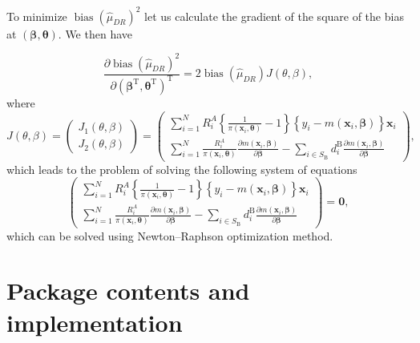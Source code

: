\documentclass[
]{jss}
\begin{document}
To minimize \(\operatorname{bias}\left(\hat{\mu}_{D R}\right)^2\) let us
calculate the gradient of the square of the bias at
\(\left(\boldsymbol{\beta}, \boldsymbol{\theta}\right)\). We then have

\begin{equation*}
\frac{\partial \operatorname{bias}\left(\hat{\mu}_{D R}\right)^2}{\partial\left(\boldsymbol{\beta}^{\mathrm{T}}, \boldsymbol{\theta}^{\mathrm{T}}\right)^{\mathrm{T}}}=2 \operatorname{bias}\left(\hat{\mu}_{D R}\right) J(\theta, \beta),
\end{equation*} where \begin{equation*}
J(\theta, \beta)=\left(\begin{array}{l}
J_1(\theta, \beta) \\
J_2(\theta, \beta)
\end{array}\right)=\left(\begin{array}{c}
\sum_{i=1}^N R_i^A\left\{\frac{1}{\pi\left(\boldsymbol{x}_i, \boldsymbol{\theta}\right)}-1\right\}\left\{y_i-m\left(\boldsymbol{x}_i, \boldsymbol{\beta}\right)\right\} \boldsymbol{x}_i \\
\sum_{i=1}^N \frac{R_i^A}{\pi\left(\boldsymbol{x}_i, \boldsymbol{\theta}\right)} \frac{\partial m\left(\boldsymbol{x}_i, \boldsymbol{\beta}\right)}{\partial \boldsymbol{\beta}}-\sum_{i \in S_{\mathrm{B}}} d_i^{\mathrm{B}} \frac{\partial m\left(\boldsymbol{x}_i, \boldsymbol{\beta}\right)}{\partial \boldsymbol{\beta}}
\end{array}\right),
\end{equation*} which leads to the problem of solving the following
system of equations \begin{equation}
\label{bias-min}
    \left(\begin{array}{c}
\sum_{i=1}^N R_i^A\left\{\frac{1}{\pi\left(\boldsymbol{x}_i, \boldsymbol{\theta}\right)}-1\right\}\left\{y_i-m\left(\boldsymbol{x}_i, \boldsymbol{\beta}\right)\right\} \boldsymbol{x}_i \\
\sum_{i=1}^N \frac{R_i^A}{\pi\left(\boldsymbol{x}_i, \boldsymbol{\theta}\right)} \frac{\partial m\left(\boldsymbol{x}_i, \boldsymbol{\beta}\right)}{\partial \boldsymbol{\beta}}-\sum_{i \in S_{\mathrm{B}}} d_i^{\mathrm{B}} \frac{\partial m\left(\boldsymbol{x}_i, \boldsymbol{\beta}\right)}{\partial \boldsymbol{\beta}}
\end{array}\right) = \boldsymbol{0},
\end{equation} which can be solved using Newton--Raphson optimization
method.

\hypertarget{package-contents-and-implementation}{%
\section{Package contents and
implementation}\label{package-contents-and-implementation}}
\end{document}
